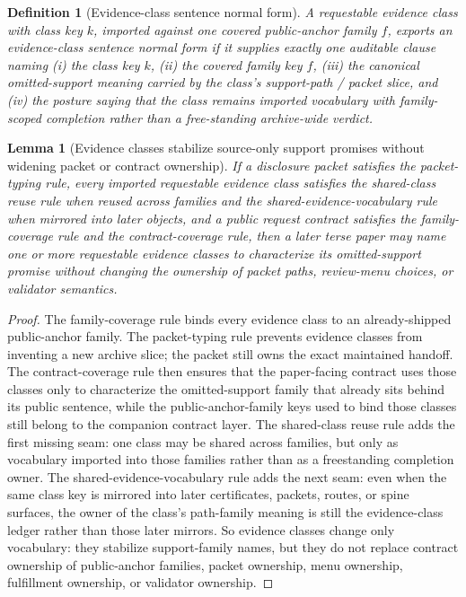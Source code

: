 \documentclass[11pt]{article}
\newtheorem{definition}{Definition}
\newtheorem{lemma}{Lemma}
\begin{document}
\begin{definition}[Evidence-class sentence normal form]
A requestable evidence class with class key $k$, imported against one covered public-anchor family $f$, exports an \emph{evidence-class sentence normal form} if it supplies exactly one auditable clause naming (i) the class key $k$, (ii) the covered family key $f$, (iii) the canonical omitted-support meaning carried by the class's support-path / packet slice, and (iv) the posture saying that the class remains imported vocabulary with family-scoped completion rather than a free-standing archive-wide verdict.
\end{definition}

\begin{lemma}[Evidence classes stabilize source-only support promises without widening packet or contract ownership]
If a disclosure packet satisfies the packet-typing rule, every imported requestable evidence class satisfies the shared-class reuse rule when reused across families and the shared-evidence-vocabulary rule when mirrored into later objects, and a public request contract satisfies the family-coverage rule and the contract-coverage rule, then a later terse paper may name one or more requestable evidence classes to characterize its omitted-support promise without changing the ownership of packet paths, review-menu choices, or validator semantics.
\end{lemma}

\begin{proof}
The family-coverage rule binds every evidence class to an already-shipped public-anchor family.
The packet-typing rule prevents evidence classes from inventing a new archive slice; the packet still owns the exact maintained handoff.
The contract-coverage rule then ensures that the paper-facing contract uses those classes only to characterize the omitted-support family that already sits behind its public sentence, while the public-anchor-family keys used to bind those classes still belong to the companion contract layer. The shared-class reuse rule adds the first missing seam: one class may be shared across families, but only as vocabulary imported into those families rather than as a freestanding completion owner. The shared-evidence-vocabulary rule adds the next seam: even when the same class key is mirrored into later certificates, packets, routes, or spine surfaces, the owner of the class's path-family meaning is still the evidence-class ledger rather than those later mirrors.
So evidence classes change only vocabulary: they stabilize support-family names, but they do not replace contract ownership of public-anchor families, packet ownership, menu ownership, fulfillment ownership, or validator ownership.\qedhere
\end{proof}
\end{document}
